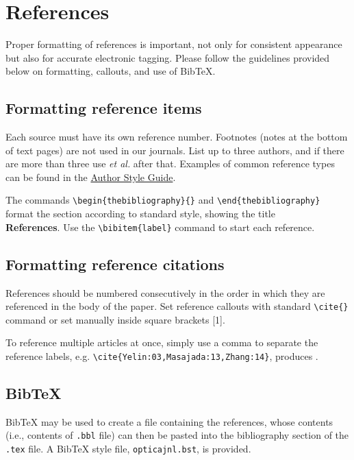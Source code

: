 \documentclass{optica-article}
\begin{document}
\section{References}
\label{sec:refs}
Proper formatting of references is important, not only for consistent appearance but also for accurate electronic tagging. Please follow the guidelines provided below on formatting, callouts, and use of Bib\TeX.

\subsection{Formatting reference items}
Each source must have its own reference number. Footnotes (notes at the bottom of text pages) are not used in our journals. List up to three authors, and if there are more than three use \emph{et al.} after that. Examples of common reference types can be found in the  \href{https://opg.optica.org/jot/submit/style/oestyleguide.cfm} {Author Style Guide}.


The commands \verb+\begin{thebibliography}{}+ and \verb+\end{thebibliography}+ format the section according to standard style, showing the title\\
{\bfseries References}.  Use the \verb+\bibitem{label}+ command to start each reference.

\subsection{Formatting reference citations}
References should be numbered consecutively in the order in which they are referenced in the body of the paper. Set reference callouts with standard \verb+\cite{}+ command or set manually inside square brackets [1].

To reference multiple articles at once, simply use a comma to separate the reference labels, e.g. \verb+\cite{Yelin:03,Masajada:13,Zhang:14}+, produces \cite{Yelin:03,Masajada:13,Zhang:14}.

\subsection{Bib\TeX}
\label{sec:bibtex}
Bib\TeX{} may be used to create a file containing the references, whose contents (i.e., contents of \texttt{.bbl} file) can then be pasted into the bibliography section of the \texttt{.tex} file. A Bib\TeX{} style file, \texttt{opticajnl.bst}, is provided.
\end{document}
